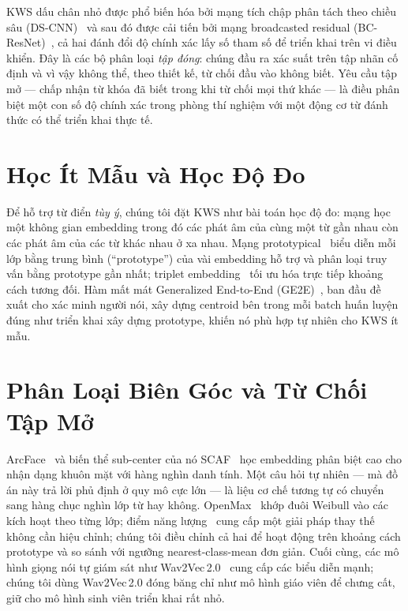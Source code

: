 \documentclass[12pt,a4paper]{report}
\begin{document}
KWS dấu chân nhỏ được phổ biến hóa bởi mạng tích chập phân tách theo chiều sâu
(DS-CNN)~\cite{zhang2017hello} và sau đó được cải tiến bởi mạng broadcasted
residual (BC-ResNet)~\cite{kim2021bcresnet}, cả hai đánh đổi độ chính xác lấy số
tham số để triển khai trên vi điều khiển. Đây là các bộ phân loại \emph{tập đóng}:
chúng đầu ra xác suất trên tập nhãn cố định và vì vậy không thể, theo thiết kế,
từ chối đầu vào không biết. Yêu cầu tập mở --- chấp nhận từ khóa đã biết trong
khi từ chối mọi thứ khác --- là điều phân biệt một con số độ chính xác trong phòng
thí nghiệm với một động cơ từ đánh thức có thể triển khai thực tế.

\section{Học Ít Mẫu và Học Độ Đo}\label{sec:fewshot-bg}

Để hỗ trợ từ điển \emph{tùy ý}, chúng tôi đặt KWS như bài toán học độ đo: mạng
học một không gian embedding trong đó các phát âm của cùng một từ gần nhau còn các
phát âm của các từ khác nhau ở xa nhau. Mạng prototypical~\cite{snell2017prototypical}
biểu diễn mỗi lớp bằng trung bình (``prototype'') của vài embedding hỗ trợ và
phân loại truy vấn bằng prototype gần nhất; triplet
embedding~\cite{schroff2015facenet} tối ưu hóa trực tiếp khoảng cách tương đối.
Hàm mất mát Generalized End-to-End (GE2E)~\cite{wan2018ge2e}, ban đầu đề xuất cho
xác minh người nói, xây dựng centroid bên trong mỗi batch huấn luyện đúng như
triển khai xây dựng prototype, khiến nó phù hợp tự nhiên cho KWS ít mẫu.

\section{Phân Loại Biên Góc và Từ Chối Tập Mở}\label{sec:arc-bg}

ArcFace~\cite{deng2019arcface} và biến thể sub-center của nó
SCAF~\cite{deng2020subcenter} học embedding phân biệt cao cho nhận dạng khuôn
mặt với hàng nghìn danh tính. Một câu hỏi tự nhiên --- mà đồ án này trả lời phủ
định ở quy mô cực lớn --- là liệu cơ chế tương tự có chuyển sang hàng chục nghìn
lớp từ hay không. OpenMax~\cite{bendale2016openmax} khớp đuôi Weibull vào các
kích hoạt theo từng lớp; điểm năng lượng~\cite{liu2020energy} cung cấp một giải
pháp thay thế không cần hiệu chỉnh; chúng tôi điều chỉnh cả hai để hoạt động trên
khoảng cách prototype và so sánh với ngưỡng nearest-class-mean đơn giản. Cuối
cùng, các mô hình giọng nói tự giám sát như Wav2Vec\,2.0~\cite{baevski2020wav2vec}
cung cấp các biểu diễn mạnh; chúng tôi dùng Wav2Vec\,2.0 đóng băng chỉ như mô
hình giáo viên để chưng cất, giữ cho mô hình sinh viên triển khai rất nhỏ.
\end{document}
